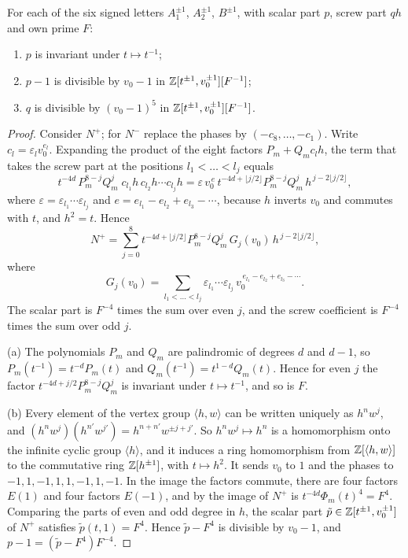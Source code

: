 \documentclass[11pt,colorlinks]{charlie}
\begin{document}
\begin{lemma}\label{lem:letters}
For each of the six signed letters $A_1^{\pm1}$, $A_2^{\pm1}$, $B^{\pm1}$, with scalar part $p$, screw part $qh$ and own prime $F$:
\begin{enumerate}[label=\textup{(\alph*)}]
\item $p$ is invariant under $t\mapsto t^{-1}$;
\item $p-1$ is divisible by $v_0-1$ in $\mathbb{Z}[t^{\pm1},v_0^{\pm1}][F^{-1}]$;
\item $q$ is divisible by $(v_0-1)^5$ in $\mathbb{Z}[t^{\pm1},v_0^{\pm1}][F^{-1}]$.
\end{enumerate}
\end{lemma}

\begin{proof}
Consider $N^+$; for $N^-$ replace the phases by $(-c_8,\dots,-c_1)$. Write $c_l=\varepsilon_lv_0^{e_l}$. Expanding the product of the eight factors $P_m+Q_mc_lh$, the term that takes the screw part at the positions $l_1<\dots<l_j$ equals
\[
  t^{-4d}\,P_m^{8-j}Q_m^{j}\;c_{l_1}h\,c_{l_2}h\cdots c_{l_j}h
  =\varepsilon\,v_0^{\,e}\,t^{-4d+\lfloor j/2\rfloor}P_m^{8-j}Q_m^{j}\,h^{\,j-2\lfloor j/2\rfloor},
\]
where $\varepsilon=\varepsilon_{l_1}\cdots\varepsilon_{l_j}$ and $e=e_{l_1}-e_{l_2}+e_{l_3}-\cdots$, because $h$ inverts $v_0$ and commutes with $t$, and $h^2=t$. Hence
\begin{equation}\label{eq:layers}
  N^+=\sum_{j=0}^{8}t^{-4d+\lfloor j/2\rfloor}P_m^{8-j}Q_m^{j}\,G_j(v_0)\,h^{\,j-2\lfloor j/2\rfloor},
\end{equation}
where
\[
  G_j(v_0)=\sum_{l_1<\dots<l_j}\varepsilon_{l_1}\cdots\varepsilon_{l_j}\,v_0^{\,e_{l_1}-e_{l_2}+e_{l_3}-\cdots}.
\]
The scalar part is $F^{-4}$ times the sum over even $j$, and the screw coefficient is $F^{-4}$ times the sum over odd $j$.

(a) The polynomials $P_m$ and $Q_m$ are palindromic of degrees $d$ and $d-1$, so $P_m(t^{-1})=t^{-d}P_m(t)$ and $Q_m(t^{-1})=t^{1-d}Q_m(t)$. Hence for even $j$ the factor $t^{-4d+j/2}P_m^{8-j}Q_m^{j}$ is invariant under $t\mapsto t^{-1}$, and so is $F$.

(b) Every element of the vertex group $\langle h,w\rangle$ can be written uniquely as $h^nw^j$, and $(h^nw^j)(h^{n'}w^{j'})=h^{n+n'}w^{\pm j+j'}$. So $h^nw^j\mapsto h^n$ is a homomorphism onto the infinite cyclic group $\langle h\rangle$, and it induces a ring homomorphism from $\mathbb{Z}[\langle h,w\rangle]$ to the commutative ring $\mathbb{Z}[h^{\pm1}]$, with $t\mapsto h^2$. It sends $v_0$ to $1$ and the phases to $-1,1,-1,1,1,-1,1,-1$. In the image the factors commute, there are four factors $E(1)$ and four factors $E(-1)$, and by  the image of $N^+$ is $t^{-4d}\Phi_m(t)^4=F^4$. Comparing the parts of even and odd degree in $h$, the scalar part $\tilde p\in\mathbb{Z}[t^{\pm1},v_0^{\pm1}]$ of $N^+$ satisfies $\tilde p(t,1)=F^4$. Hence $\tilde p-F^4$ is divisible by $v_0-1$, and $p-1=(\tilde p-F^4)F^{-4}$.


\end{proof}
\end{document}
